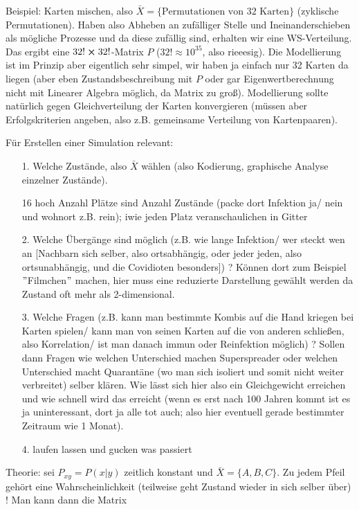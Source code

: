 Beispiel: Karten mischen, also $\bar{X}= \{\text{Permutationen von 32 Karten}\}$ (zyklische Permutationen). Haben also Abheben an zufälliger Stelle und Ineinanderschieben als mögliche Prozesse und da diese zufällig sind, erhalten wir eine WS-Verteilung. Das ergibt eine $32! \cross 32!$-Matrix $P$ ($32! \approx10^{35}$, also rieeesig). Die Modellierung ist im Prinzip aber eigentlich sehr simpel, wir haben ja einfach nur 32 Karten da liegen (aber eben Zustandsbeschreibung mit $P$ oder gar Eigenwertberechnung nicht mit Linearer Algebra möglich, da Matrix zu groß). Modellierung sollte natürlich gegen Gleichverteilung der Karten konvergieren (müssen aber Erfolgskriterien angeben, also z.B. gemeinsame Verteilung von Kartenpaaren).

Für Erstellen einer Simulation relevant:
\begin{itemize}
\item[1.] Welche Zustände, also $\bar{X}$ wählen (also Kodierung, graphische Analyse einzelner Zustände).

16 hoch Anzahl Plätze sind Anzahl Zustände (packe dort Infektion ja/ nein und wohnort z.B. rein); iwie jeden Platz veranschaulichen in Gitter

\item[2.] Welche Übergänge sind möglich (z.B. wie lange Infektion/ wer steckt wen an [Nachbarn sich selber, also ortsabhängig, oder jeder jeden, also ortsunabhängig, und die Covidioten besonders]) ? Können dort zum Beispiel $"$Filmchen$"$ machen, hier muss eine reduzierte Darstellung gewählt werden da Zustand oft mehr als 2-dimensional.

\item[3.] Welche Fragen (z.B. kann man bestimmte Kombis auf die Hand kriegen bei Karten spielen/ kann man von seinen Karten auf die von anderen schließen, also Korrelation/ ist man danach immun oder Reinfektion möglich) ? Sollen dann Fragen wie welchen Unterschied machen Superspreader oder welchen Unterschied macht Quarantäne (wo man sich isoliert und somit nicht weiter verbreitet) selber klären. Wie lässt sich hier also ein Gleichgewicht erreichen und wie schnell wird das erreicht (wenn es erst nach 100 Jahren kommt ist es ja uninteressant, dort ja alle tot auch; also hier eventuell gerade bestimmter Zeitraum wie 1 Monat).

\item[4.] laufen lassen und gucken was passiert
\end{itemize}

Theorie: sei $P_{xy} = P(x|y)$ zeitlich konstant und $\bar{X}= \{A, B, C\}$. Zu jedem Pfeil gehört eine Wahrscheinlichkeit (teilweise geht Zustand wieder in sich selber über) ! Man kann dann die Matrix 

